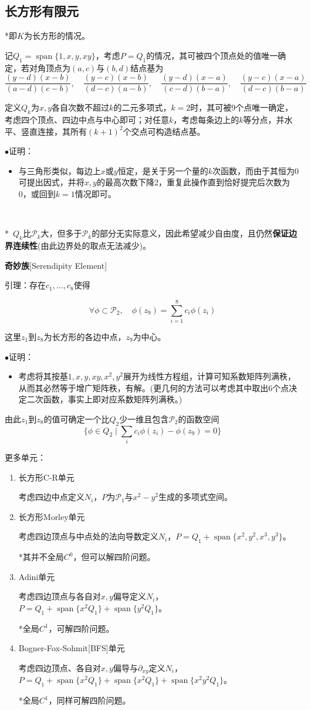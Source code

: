 \documentclass[a4paper,UTF8,fontset=windows]{ctexart}
\newcommand*{\cp}{\mathcal{P}}
\newcommand{\proo}[1]{{\kaishu $\bullet$证明：
\begin{itemize}
    \item[] #1
\end{itemize}
}}
\DeclareMathOperator*{\Span}{span}
\begin{document}
\subsection{长方形有限元}
*即$K$为长方形的情况。

记$Q_1=\Span\{1,x,y,xy\}$，考虑$P=Q_1$的情况，其可被四个顶点处的值唯一确定，若对角顶点为$(a,c)$与$(b,d)$结点基为
$$\frac{(y-d)(x-b)}{(a-d)(c-b)},\quad\frac{(y-c)(x-b)}{(d-c)(a-b)},\quad\frac{(y-d)(x-a)}{(c-d)(b-a)},\quad\frac{(y-c)(x-a)}{(d-c)(b-a)}$$

定义$Q_k$为$x,y$各自次数不超过$k$的二元多项式，$k=2$时，其可被9个点唯一确定，考虑四个顶点、四边中点与中心即可；对任意$k$，考虑每条边上的$k$等分点，并水平、竖直连接，其所有$(k+1)^2$个交点可构造结点基。

\proo{
    与三角形类似，每边上$x$或$y$恒定，是关于另一个量的$k$次函数，而由于其恒为0可提出因式，并将$x,y$的最高次数下降2，重复此操作直到恰好提完后次数为0，或回到$k=1$情况即可。
}

\

*\ $Q_k$比$\cp_k$大，但多于$\cp_k$的部分无实际意义，因此希望减少自由度，且仍然\textbf{保证边界连续性}(由此边界处的取点无法减少)。

\textbf{奇妙族}[Serendipity Element]

引理：存在$c_1,\dots,c_8$使得

$$\forall\phi\subset \cp_2,\quad \phi(z_9)=\sum_{i=1}^8c_i\phi(z_i)$$

这里$z_1$到$z_8$为长方形的各边中点，$z_9$为中心。

\proo{
    考虑将其按基$1,x,y,xy,x^2,y^2$展开为线性方程组，计算可知系数矩阵列满秩，从而其必然等于增广矩阵秩，有解。(更几何的方法可以考虑其中取出6个点决定二次函数，事实上即对应系数矩阵列满秩。)
}

由此$z_1$到$z_8$的值可确定一个比$Q_2$少一维且包含$\cp_2$的函数空间
$$\bigg\{\phi\in Q_2\mid\sum_ic_i\phi(z_i)-\phi(z_9)=0\bigg\}$$

更多单元：
\begin{enumerate}
    \item 长方形C-R单元
    
    考虑四边中点定义$N_i$，$P$为$\cp_1$与$x^2-y^2$生成的多项式空间。

    \item 长方形Morley单元
    
    考虑四边顶点与中点处的法向导数定义$N_i$，$P=Q_1+\Span\{x^2,y^2,x^3,y^3\}$。

    *其并不全局$C^0$，但可以解四阶问题。

    \item Adini单元
    
    考虑四边顶点与各自对$x,y$偏导定义$N_i$，$P=Q_1+\Span\{x^2Q_1\}+\Span\{y^2Q_1\}$。
    
    *全局$C^1$，可解四阶问题。

    \item Bogner-Fox-Sohmit[BFS]单元
    
    考虑四边顶点、各自对$x,y$偏导与$\partial_{xy}$定义$N_i$，$P=Q_1+\Span\{x^2Q_1\}+\Span\{x^2Q_1\}+\Span\{x^2y^2Q_1\}$。

    *全局$C^1$，同样可解四阶问题。
\end{enumerate}
\end{document}
